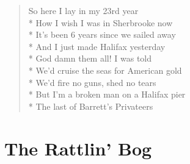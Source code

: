 \documentclass[9pt,twoside]{extarticle}
\newenvironment{xverse}{
	\begin{verse}
	\fontsize{8.5}{10.5}\selectfont
	}
	{
	\end{verse}
	\penalty 0
}
\begin{document}
\begin{xverse}
So here I lay in my 23rd year \\*
How I wish I was in Sherbrooke now \\*
It’s been 6 years since we sailed away \\*
And I just made Halifax yesterday \\*
God damn them all! I was told \\*
We’d cruise the seas for American gold \\*
We’d fire no guns, shed no tears \\*
But I’m a broken man on a Halifax pier \\*
The last of Barrett’s Privateers
\end{xverse}

\section{The Rattlin’ Bog}
\end{document}
